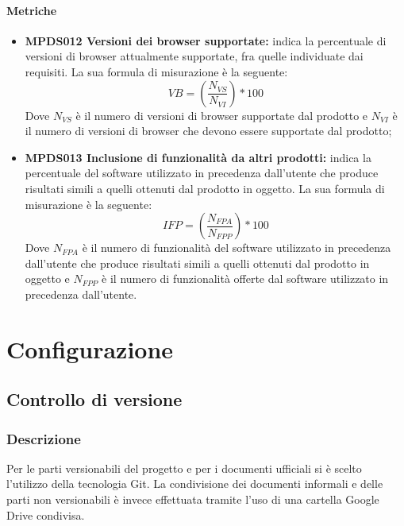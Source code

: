 \documentclass[NormeDiProgetto.tex]{subfiles}
\begin{document}
	\paragraph{Metriche}
	\begin{itemize}
		\item \textbf{MPDS012 Versioni dei browser supportate:} indica la percentuale di versioni di browser attualmente supportate, fra quelle individuate dai requisiti. La sua formula di misurazione è la seguente: \[VB=(\frac{N_{VS}}{N_{VI}})*100\] Dove $ N_{VS} $ è il numero di versioni di browser supportate dal prodotto e $ N_{VI} $ è il numero di versioni di browser che devono essere supportate dal prodotto;
		\item \textbf{MPDS013 Inclusione di funzionalità da altri prodotti:} indica la percentuale del software utilizzato in precedenza dall'utente che produce risultati simili a quelli ottenuti dal prodotto in oggetto. La sua formula di misurazione è la seguente: \[IFP=(\frac{N_{FPA}}{N_{FPP}})*100\] Dove $ N_{FPA} $ è il numero di funzionalità del software utilizzato in precedenza dall'utente che produce risultati simili a quelli ottenuti dal prodotto in oggetto e $ N_{FPP} $ è il numero di funzionalità offerte dal software utilizzato in precedenza dall'utente. 
	\end{itemize}
	
	\section{Configurazione}
	
	\subsection{Controllo di versione}
	
	\subsubsection{Descrizione}
	Per le parti versionabili del progetto e per i documenti ufficiali si è scelto l'utilizzo della tecnologia Git.
	La condivisione dei documenti informali e delle parti non versionabili è invece effettuata tramite l'uso di una cartella Google Drive condivisa.
	
\end{document}
